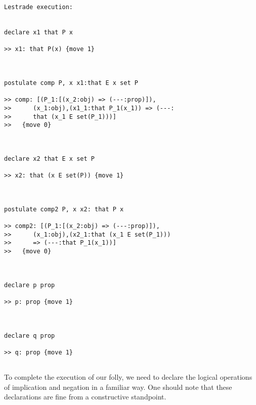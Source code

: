\documentclass[12pt]{article}
\begin{document}
\begin{verbatim}Lestrade execution:


declare x1 that P x

>> x1: that P(x) {move 1}



postulate comp P, x x1:that E x set P

>> comp: [(P_1:[(x_2:obj) => (---:prop)]),
>>      (x_1:obj),(x1_1:that P_1(x_1)) => (---:
>>      that (x_1 E set(P_1)))]
>>   {move 0}



declare x2 that E x set P

>> x2: that (x E set(P)) {move 1}



postulate comp2 P, x x2: that P x

>> comp2: [(P_1:[(x_2:obj) => (---:prop)]),
>>      (x_1:obj),(x2_1:that (x_1 E set(P_1)))
>>      => (---:that P_1(x_1))]
>>   {move 0}



declare p prop

>> p: prop {move 1}



declare q prop

>> q: prop {move 1}


\end{verbatim}

To complete the execution of our folly, we need to declare the logical operations of implication and negation in a familiar way.  One should note that these declarations  are fine from a constructive standpoint.
\end{document}
